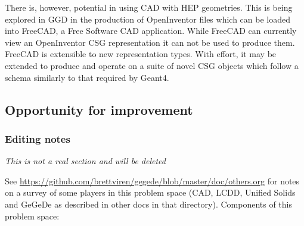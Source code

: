 There is, however, potential in using CAD with HEP geometries.  This
is being explored in GGD in the production of OpenInventor files which
can be loaded into FreeCAD, a Free Software CAD application.  While
FreeCAD can currently view an OpenInventor CSG representation it can
not be used to produce them.  FreeCAD is extensible to new
representation types.  With effort, it may be extended to produce and
operate on a suite of novel CSG objects which follow a schema
similarly to that required by Geant4.


\subsection{Opportunity for improvement}

\subsubsection{Editing notes}

\textit{This is not a real section and will be deleted}


See
\url{https://github.com/brettviren/gegede/blob/master/doc/others.org}
for notes on a survey of some players in this problem space (CAD,
LCDD, Unified Solids and GeGeDe as described in other docs in that
directory).  Components of this problem space:

